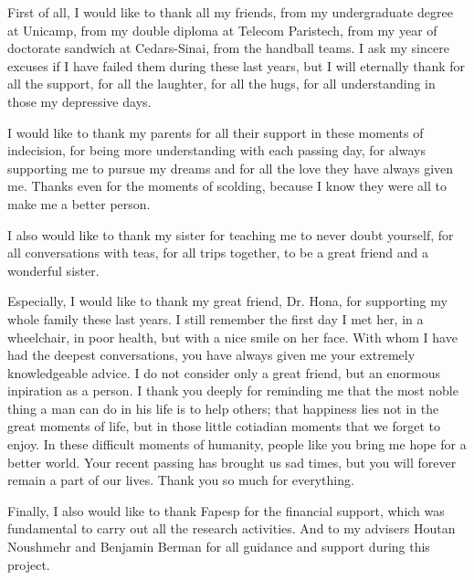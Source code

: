 

First of all, I would like to thank all my friends, from my undergraduate degree at Unicamp, from my double diploma at Telecom Paristech, from my year of doctorate sandwich at Cedars-Sinai, from the handball teams. I ask my sincere excuses if I have failed them during these last years, but I will eternally thank for all the support, for all the laughter, for all the hugs, for all understanding in those my depressive days.

I would like to thank my parents for all their support in these moments of indecision, for being more understanding with each passing day, for always supporting me to pursue my dreams and for all the love they have always given me. Thanks even for the moments of scolding, because I know they were all to make me a better person.

I also would like to thank my sister for teaching me to never doubt yourself, for all conversations with teas, for all trips together, to be a great friend and a wonderful sister.

Especially, I would like to thank my great friend, Dr. Hona, for supporting my whole family these last years.
I still remember the first day I met her, in a wheelchair, in poor health, but with a nice smile on her face. With whom I have had the deepest conversations, you have always given me your extremely knowledgeable advice. I do not consider only a great friend, but an enormous inpiration as a person. I thank you deeply for reminding me that the most noble thing a man can do in his life is to help others; that happiness lies not in the great moments of life, but in those little cotiadian moments that we forget to enjoy. In these difficult moments of humanity, people like you bring me hope for a better world. Your recent passing has brought us sad times, but you will forever remain a part of our lives. Thank you so much for everything.


Finally, I also would like to thank Fapesp for the financial support, which was fundamental to carry out all the research activities. And to my advisers Houtan Noushmehr and Benjamin Berman for all guidance and support during this project.\\
